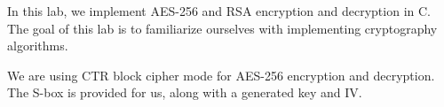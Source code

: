 In this lab, we implement AES-256 and RSA encryption and decryption in C. 
The goal of  this lab is to familiarize ourselves with implementing cryptography algorithms.

We are using CTR block cipher mode for AES-256 encryption and decryption.
The S-box is provided for us, along with a generated key and IV.
